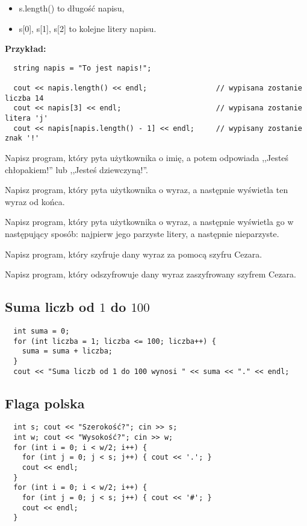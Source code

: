 \documentclass[a4paper, 10pt, pdftex, dvipsnames]{scrartcl}
\newcounter{zad}
\newcounter{pkt}
\newcommand{\zad}{\vspace{4mm}\noindent\setcounter{pkt}{0}\stepcounter{zad}{\bf \thezad.} }
\newcommand{\zadgw}{\vspace{4mm}\noindent\setcounter{pkt}{0}\stepcounter{zad}{\bf \thezad$^*$} }
\begin{document}
\begin{itemize}
  \item s.length() to długość napisu,
  \item s[0], s[1], s[2] to kolejne litery napisu.
\end{itemize}

\vspace{2mm}\noindent
{\bf Przykład:} 
\begin{verbatim}
  string napis = "To jest napis!";

  cout << napis.length() << endl;                // wypisana zostanie liczba 14
  cout << napis[3] << endl;                      // wypisana zostanie litera 'j'
  cout << napis[napis.length() - 1] << endl;     // wypisany zostanie znak '!'  
\end{verbatim}


\zadgw Napisz program, który pyta użytkownika o imię, a potem odpowiada ,,Jesteś chłopakiem!'' lub ,,Jesteś dziewczyną!''.

\zad Napisz program, który pyta użytkownika o wyraz, a następnie wyświetla ten wyraz od końca.

\zad Napisz program, który pyta użytkownika o wyraz, a następnie wyświetla go w następujący sposób: najpierw jego parzyste litery, a następnie nieparzyste.



\zad Napisz program, który szyfruje dany wyraz za pomocą szyfru Cezara.

\zad Napisz program, który odszyfrowuje dany wyraz zaszyfrowany szyfrem Cezara.

\subsection*{Suma liczb od $1$ do $100$}
\begin{verbatim}
  int suma = 0;
  for (int liczba = 1; liczba <= 100; liczba++) {
    suma = suma + liczba;
  }
  cout << "Suma liczb od 1 do 100 wynosi " << suma << "." << endl;
\end{verbatim}

\subsection*{Flaga polska}
\begin{verbatim}
  int s; cout << "Szerokość?"; cin >> s;
  int w; cout << "Wysokość?"; cin >> w;
  for (int i = 0; i < w/2; i++) {
    for (int j = 0; j < s; j++) { cout << '.'; }
    cout << endl;
  }
  for (int i = 0; i < w/2; i++) {
    for (int j = 0; j < s; j++) { cout << '#'; }
    cout << endl;
  }  
\end{verbatim}
\end{document}
